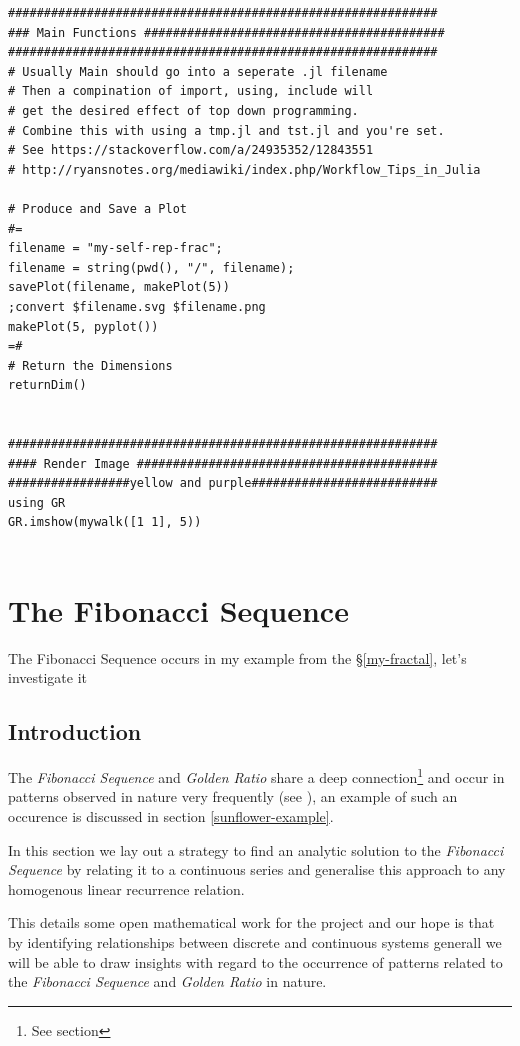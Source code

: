 \documentclass[11pt]{article}
\begin{document}
\begin{verbatim}
############################################################
### Main Functions ##########################################
############################################################
# Usually Main should go into a seperate .jl filename
# Then a compination of import, using, include will
# get the desired effect of top down programming.
# Combine this with using a tmp.jl and tst.jl and you're set.
# See https://stackoverflow.com/a/24935352/12843551
# http://ryansnotes.org/mediawiki/index.php/Workflow_Tips_in_Julia

# Produce and Save a Plot
#=
filename = "my-self-rep-frac";
filename = string(pwd(), "/", filename);
savePlot(filename, makePlot(5))
;convert $filename.svg $filename.png
makePlot(5, pyplot())
=#
# Return the Dimensions
returnDim()


############################################################
#### Render Image ##########################################
#################yellow and purple##########################
using GR
GR.imshow(mywalk([1 1], 5))


\end{verbatim}

\section{The Fibonacci Sequence}
\label{sec:org52ccdb8}
The Fibonacci Sequence occurs in my example from the \S \ref{my-fractal}, let's investigate it
\subsection{Introduction}
\label{sec:orga22c5d5}
The \emph{Fibonacci Sequence} and \emph{Golden Ratio} share a deep connection\footnote{See section} and occur in patterns observed in nature very frequently
(see
\cite{shellyallenFibonacciNature,benedettapalazzoNumbersNatureFibonacci2016,MinarovaNikoletta2014TFSN,NatureGoldenRatio2018,robertlambHowAreFibonacci2008,ronknottFibonacciNumbersGolden2016}), an example of such an occurence is discussed in section \ref{sunflower-example}.


In this section we lay out a strategy to find an analytic solution to the
\emph{Fibonacci Sequence} by relating it to a continuous series and generalise this
approach to any homogenous linear recurrence relation.

This details some open mathematical work for the project and our hope is that by
identifying relationships between discrete and continuous systems generall we
will be able to draw insights with regard to the occurrence of patterns related
to the \emph{Fibonacci Sequence} and \emph{Golden Ratio} in nature.
\end{document}
